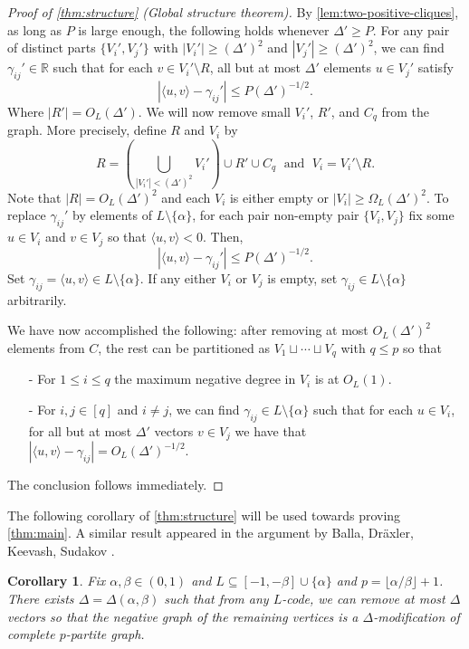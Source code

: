 \documentclass[reqno, 11pt]{amsart}
\newtheorem{corollary}[theorem]{Corollary}
\theoremstyle{definition}
\theoremstyle{remark}
\newcommand{\paren}[1]{\left( #1 \right)}
\newcommand{\RR}{\mathbb{R}}
\begin{document}
\begin{proof}[Proof of \cref{thm:structure} (Global structure theorem)]
 By \cref{lem:two-positive-cliques}, as long as $P$ is large enough, the following holds whenever $\Delta' \geq P$.  For any pair of distinct parts $\{V_i', V_j'\}$ with $|V_i'| \geq (\Delta')^2$ and $|V_j'| \geq (\Delta')^2$, we can find $ \gamma_{ij}' \in \RR$ such that for each $v \in V_i' \setminus R$, all but at most $\Delta'$ elements $u \in V_j'$ satisfy
 \[
 	|\langle u,v \rangle - \gamma_{ij}'| \leq P(\Delta')^{-1/2}.
 \]
Where $|R'| = O_L(\Delta')$. We will now remove small $V_i'$, $R'$, and $C_q$ from the graph. More precisely, define $R$ and $V_i$ by 
\[
    R = \paren{\bigcup_{|V_i'| < (\Delta')^2} V_i'} \cup R'  \cup C_q  \; \text{ and }  \; V_i = V_i' \setminus R.
\]
Note that $|R| = O_L(\Delta')^2$ and each $V_i$ is either empty or $|V_i| \geq \Omega_L(\Delta')^2$. To replace $\gamma_{ij}'$ by elements of $L \setminus \{\alpha\}$, for each pair non-empty pair $\{V_i, V_j\}$ fix some $u \in V_i$ and $v \in V_j$  so that $\langle u,v \rangle < 0$. Then,
\[
	|\langle u,v \rangle - \gamma_{ij}'| \leq P(\Delta')^{-1/2}.
\]
Set $\gamma_{ij} = \langle u,v \rangle \in L \setminus \{\alpha\}$. If any either $V_i$ or $V_j$ is empty, set $\gamma_{ij} \in L \setminus \{\alpha\}$ arbitrarily.



We have now accomplished the following: after removing at most $O_L(\Delta')^2$ elements from $C$, the rest can be partitioned as $ V_1 \sqcup \cdots \sqcup V_q$ with $q \leq p$ so that
\begin{itemize}
	\item[-] For $1 \leq i \leq q$ the maximum negative degree in $V_i$ is at $O_L(1)$.
	\item[-] For $i,j \in [q]$ and $i\ne j$, we can find $\gamma_{ij} \in L \setminus \{\alpha\}$ such that for each $u \in V_i$, for all but at most $\Delta'$ vectors $v \in V_j$ we have that $|\langle u, v \rangle - \gamma_{ij}| = O_L(\Delta')^{-1/2}$.
\end{itemize}
The conclusion follows immediately.
\end{proof}

The following corollary of \cref{thm:structure} will be used towards proving \cref{thm:main}.
A similar result appeared in the argument by Balla, Dr\"{a}xler, Keevash, Sudakov \cite{BDKS18}.


\begin{corollary}\label{cor:global} 
Fix $\alpha, \beta \in (0,1) $ and $L \subseteq [-1,-\beta]\cup\{\alpha\}$ and $p = \lfloor \alpha/ \beta \rfloor + 1$. There exists $\Delta = \Delta(\alpha,\beta)$  such that from any $L$-code, we can remove at most $\Delta$ vectors so that the negative graph of the remaining vertices is a $\Delta$-modification of complete $p$-partite graph.
\end{corollary}
\end{document}
